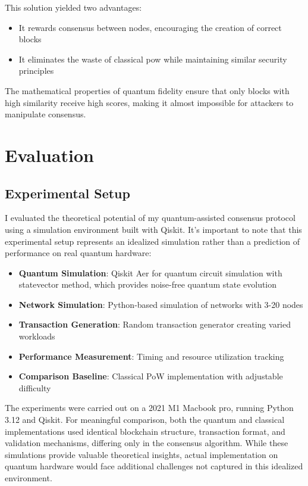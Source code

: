\documentclass[11pt,a4paper]{article}
\begin{document}
This solution yielded two advantages:
\begin{itemize}
    \item It rewards consensus between nodes, encouraging the creation of correct blocks
    \item It eliminates the waste of classical \gls{pow} while maintaining similar security principles
\end{itemize}

The mathematical properties of quantum fidelity ensure that only blocks with high similarity receive high scores, making it almost impossible for attackers to manipulate consensus.

\section{Evaluation}

\subsection{Experimental Setup}
I evaluated the theoretical potential of my quantum-assisted consensus protocol using a simulation environment built with Qiskit. It's important to note that this experimental setup represents an idealized simulation rather than a prediction of performance on real quantum hardware:

\begin{itemize}
    \item \textbf{Quantum Simulation}: Qiskit Aer for quantum circuit simulation with statevector method, which provides noise-free quantum state evolution
    \item \textbf{Network Simulation}: Python-based simulation of networks with 3-20 nodes
    \item \textbf{Transaction Generation}: Random transaction generator creating varied workloads
    \item \textbf{Performance Measurement}: Timing and resource utilization tracking
    \item \textbf{Comparison Baseline}: Classical PoW implementation with adjustable difficulty
\end{itemize}

The experiments were carried out on a 2021 M1 Macbook pro, running Python 3.12 and Qiskit. For meaningful comparison, both the quantum and classical implementations used identical blockchain structure, transaction format, and validation mechanisms, differing only in the consensus algorithm. While these simulations provide valuable theoretical insights, actual implementation on quantum hardware would face additional challenges not captured in this idealized environment.
\end{document}
